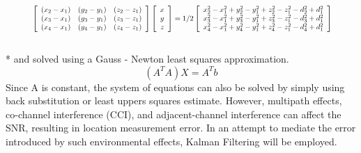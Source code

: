 \documentclass[conference]{IEEEtran}
\begin{document}
\begin{equation}
\resizebox{0.9\hsize}{!}{
$\left[ \begin{array}{ccc}
(x_2 - x_1) & (y_2 - y_1) & (z_2 - z_1)\\
(x_3 - x_1) & (y_3 - y_1) & (z_3 - z_1) \\
(x_4 - x_1) & (y_4 - y_1) & (z_4 - z_1) \\
\end{array} \right] 
% 
\left[ \begin{array}{c}
x \\
y\\
z\\
\end{array} \right]
%
= 1/2 
\left[ \begin{array}{c}
x_2^2 - x_1^2 + y_2^2 - y_1^2 + z_2^2 - z_1^2 - d_2^2 + d_1^2 \\
x_3^2 - x_1^2 + y_3^2 - y_1^2 + z_3^2 - z_1^2 - d_3^2 + d_1^2 \\
x_4^2 - x_1^2 + y_4^2 - y_1^2 + z_4^2 - z_1^2 - d_4^2 + d_1^2 \\
\end{array} \right]
$}
\end{equation}
\\*
\newline and solved using a Gauss - Newton least squares approximation. 
\begin{equation}
(A^TA)X = A^Tb
\end{equation}
\newline
Since A is constant, the system of equations can also be solved by simply using back substitution or least uppers squares estimate.
\newline
However, multipath  effects,  co-channel  interference  (CCI), and  adjacent-channel  interference can  affect  the  SNR,  resulting  in  location  measurement  error. In an attempt to mediate the error introduced by such environmental effects, Kalman Filtering will be employed.
\newline
\end{document}
